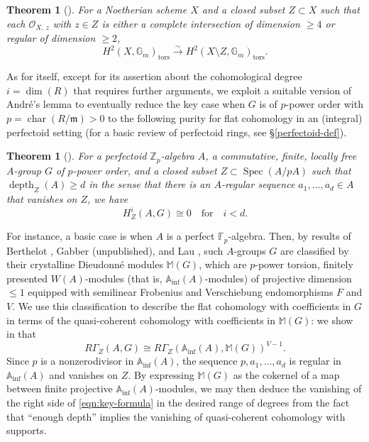 \documentclass[11pt, reqno]{amsart}
\newcommand{\bA}{\mathbb{A}}
\newcommand{\bF}{\mathbb{F}}
\newcommand{\bG}{\mathbb{G}}
\newcommand{\bM}{\mathbb{M}}
\newcommand{\bZ}{\mathbb{Z}}
\newcommand{\fm}{\mathfrak{m}}
\newcommand{\sO}{\mathscr{O}}
\DeclareMathOperator{\Char}{char}		%
\DeclareMathOperator{\depth}{depth}	%
\DeclareMathOperator{\Spec}{Spec}		%
\newcommand{\Inf}{\mathrm{inf}}		%
\newcommand{\isomto}{\overset{\sim}{\longrightarrow}}
\newcommand{\tors}{\mathrm{tors}}		%
\providecommand{\qxq}[1]{\quad\text{#1}\quad}
\newcommand{\be}{\begin{equation}}
\newcommand{\ee}{\end{equation}}
\newcommand{\bthm}{\begin{thm}}
\newcommand{\ethm}{\end{thm}}
\numberwithin{equation}{numberingbase}
\theoremstyle{thms}
\newtheorem{thm}[numberingbase]{Theorem}
\theoremstyle{claims}
\theoremstyle{defs}
\theoremstyle{thms}
\theoremstyle{defs}
\theoremstyle{subsection-tweak}
\theoremstyle{subsection-tweak}
\begin{document}
\bthm[] 
For a Noetherian scheme $X$ and a closed subset $Z \subset X$ such that each $\sO_{X,\, z}$ with $z \in Z$ is either a complete intersection of dimension $\ge 4$ or regular of dimension $\ge 2$, 
\[
H^2(X, \bG_m)_\tors \isomto H^2(X \setminus Z, \bG_m)_\tors.
\]
\ethm



As for  itself, except for its assertion about the cohomological degree $i = \dim(R)$ that requires further arguments, we exploit a suitable version of Andr\'{e}'s lemma to eventually reduce the key case when $G$ is of $p$-power order with $p = \Char(R/\fm) > 0$ to the following purity for flat cohomology in an (integral) perfectoid setting (for a basic review of perfectoid rings, see \S\ref{perfectoid-def}).

\bthm[] \label{thm:perfectoid-purity-ann}
For a perfectoid $\bZ_p$-algebra $A$, a commutative, finite, locally free $A$-group $G$ of $p$-power order, and a closed subset $Z \subset \Spec (A/pA)$ such that $\depth_Z(A) \ge d$ in the sense that there is an $A$-regular sequence $a_1, \dotsc, a_d \in A$ that vanishes on $Z$, we have
\[
H^i_Z(A, G) \cong 0 \qxq{for} i < d.
\]
\ethm


For instance, a basic case is when $A$ is a perfect $\bF_p$-algebra. Then, by results of Berthelot \cite{Ber80}, Gabber (unpublished), and Lau \cite{Lau13}, such $A$-groups $G$ are classified by their crystalline Dieudonn\'{e} modules $\bM(G)$, which are $p$-power torsion, finitely presented $W(A)$-modules (that is, $\bA_\Inf(A)$-modules) of projective dimension $\le 1$ equipped with semilinear Frobenius and Verschiebung endomorphisms $F$ and $V$. We use this classification to describe the flat cohomology with coefficients in $G$ in terms of the quasi-coherent cohomology with coefficients in $\bM(G)$: we show in  that
\be\tag{$1.1.6$} \label{eqn:key-formula}
R\Gamma_Z(A, G) \cong R\Gamma_Z(\bA_\Inf(A), \bM(G))^{V - 1}.
\ee
Since $p$ is a nonzerodivisor in $\bA_\Inf(A)$, the sequence $p, a_1, \dotsc, a_d$ is regular in $\bA_\Inf(A)$ and vanishes on $Z$. By expressing $\bM(G)$ as the cokernel of a map between finite projective $\bA_\Inf(A)$-modules, we may then deduce the vanishing of the right side of \eqref{eqn:key-formula} in the desired range of degrees from the fact that ``enough depth'' implies the vanishing of quasi-coherent cohomology with supports.
\end{document}

